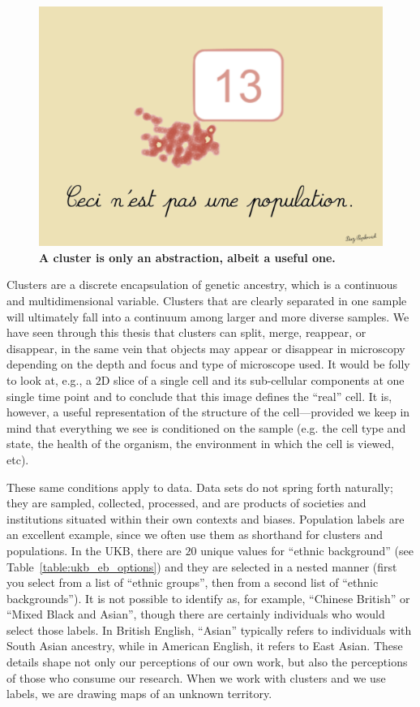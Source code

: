 \begin{figure}[h]
\centering
    \includegraphics[width=0.75\linewidth]{main_figures/discussion/magritte.png}
\caption[The treachery of clustering]{\textbf{A cluster is only an abstraction, albeit a useful one.}}
\label{fig:magritte}
\end{figure}

Clusters are a discrete encapsulation of genetic ancestry, which is a continuous and multidimensional variable. Clusters that are clearly separated in one sample will ultimately fall into a continuum among larger and more diverse samples\citep{lewis_getting_2022}. We have seen through this thesis that clusters can split, merge, reappear, or disappear, in the same vein that objects may appear or disappear in microscopy depending on the depth and focus and type of microscope used. It would be folly to look at, e.g., a $2$D slice of a single cell and its sub-cellular components at one single time point and to conclude that this image defines the ``real'' cell. It is, however, a useful representation of the structure of the cell---provided we keep in mind that everything we see is conditioned on the sample (e.g. the cell type and state, the health of the organism, the environment in which the cell is viewed, etc).

These same conditions apply to data. Data sets do not spring forth naturally; they are sampled, collected, processed, and are products of societies and institutions situated within their own contexts and biases\citep{dignazio_data_2020}. Population labels are an excellent example, since we often use them as shorthand for clusters and populations. In the UKB, there are $20$ unique values for ``ethnic background'' (see Table~\ref{table:ukb_eb_options}) and they are selected in a nested manner (first you select from a list of ``ethnic groups'', then from a second list of ``ethnic backgrounds''). It is not possible to identify as, for example, ``Chinese British'' or ``Mixed Black and Asian'', though there are certainly individuals who would select those labels. In British English, ``Asian'' typically refers to individuals with South Asian ancestry, while in American English, it refers to East Asian. These details shape not only our perceptions of our own work, but also the perceptions of those who consume our research. When we work with clusters and we use labels, we are drawing maps of an unknown territory.

